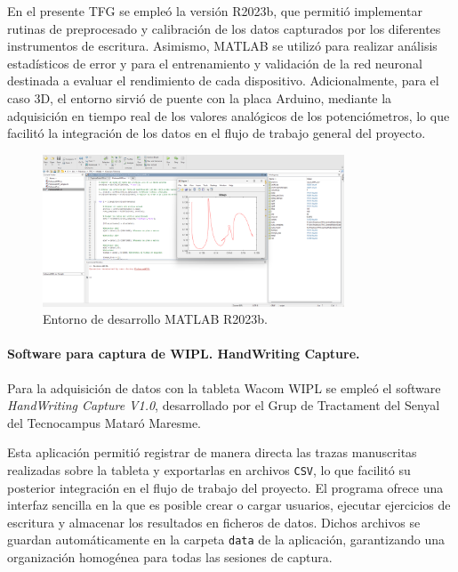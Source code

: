 \documentclass[12pt,a4paper,oneside]{report}
\begin{document}
En el presente TFG se empleó la versión R2023b, que permitió 
implementar rutinas de preprocesado y calibración de los datos 
capturados por los diferentes instrumentos de escritura. Asimismo, 
MATLAB se utilizó para realizar análisis estadísticos de error y 
para el entrenamiento y validación de la red neuronal destinada a 
evaluar el rendimiento de cada dispositivo. Adicionalmente, para el caso
3D, el entorno sirvió de puente con la placa Arduino, mediante la adquisición en 
tiempo real de los valores analógicos de los potenciómetros, lo 
que facilitó la integración de los datos en el flujo de trabajo 
general del proyecto.

\begin{figure}[H]
\centering
\includegraphics[width=0.8\textwidth]{figuras/interfazMatlab.png}
\caption{Entorno de desarrollo MATLAB R2023b.}
\label{fig:MATLAB}
\end{figure}

\paragraph{Software para captura de \acrshort{WIPL}. HandWriting Capture.}Para la adquisición de datos con la tableta Wacom \acrshort{WIPL} 
se empleó el software \textit{HandWriting Capture V1.0}, 
desarrollado por el Grup de Tractament del Senyal del 
Tecnocampus Mataró Maresme.\cite{HandWritingCapture} 

Esta aplicación permitió registrar de manera directa las 
trazas manuscritas realizadas sobre la tableta y exportarlas en 
archivos \texttt{CSV}, lo que facilitó su posterior integración 
en el flujo de trabajo del proyecto. El programa ofrece una 
interfaz sencilla en la que es posible crear o cargar usuarios, 
ejecutar ejercicios de escritura y almacenar los resultados en 
ficheros de datos. Dichos archivos se guardan automáticamente en 
la carpeta \texttt{data} de la aplicación, garantizando una 
organización homogénea para todas las sesiones de captura.\cite{HandWritingCapture} 
\end{document}
